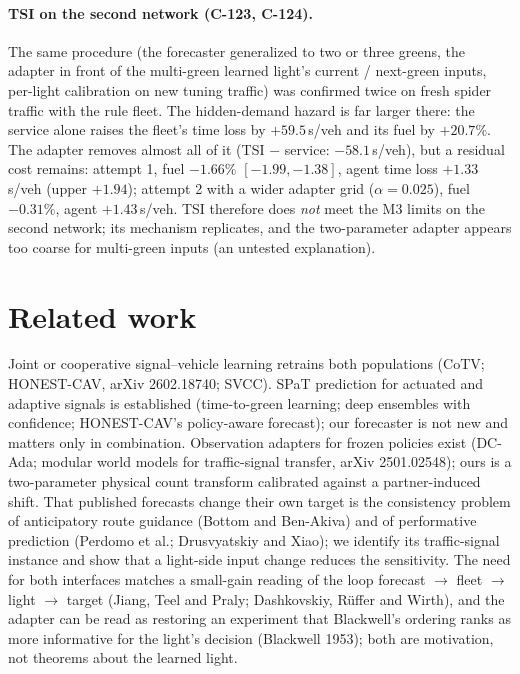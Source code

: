 \documentclass[11pt]{article}
\begin{document}
\paragraph{TSI on the second network (C-123, C-124).} The same procedure (the forecaster generalized to two or three greens, the adapter
in front of the multi-green learned light's current / next-green inputs, per-light calibration on new tuning traffic) was confirmed twice on
fresh spider traffic with the rule fleet. The hidden-demand hazard is far larger there: the service alone raises the fleet's time loss by
$+59.5$\,s/veh and its fuel by $+20.7\%$. The adapter removes almost all of it (TSI $-$ service: $-58.1$\,s/veh), but a residual cost
remains: attempt 1, fuel $-1.66\%$ $[-1.99,-1.38]$, agent time loss $+1.33$\,s/veh (upper $+1.94$); attempt 2 with a wider adapter grid
($\alpha=0.025$), fuel $-0.31\%$, agent $+1.43$\,s/veh. TSI therefore does \emph{not} meet the M3 limits on the second network; its
mechanism replicates, and the two-parameter adapter appears too coarse for multi-green inputs (an untested explanation).

\section{Related work}
Joint or cooperative signal--vehicle learning retrains both populations (CoTV; HONEST-CAV, arXiv 2602.18740; SVCC). SPaT prediction for
actuated and adaptive signals is established (time-to-green learning; deep ensembles with confidence; HONEST-CAV's policy-aware
forecast); our forecaster is not new and matters only in combination. Observation adapters for frozen policies exist (DC-Ada; modular
world models for traffic-signal transfer, arXiv 2501.02548); ours is a two-parameter physical count transform calibrated against a
partner-induced shift. That published forecasts change their own target is the consistency problem of anticipatory route guidance (Bottom
and Ben-Akiva) and of performative prediction (Perdomo et al.; Drusvyatskiy and Xiao); we identify its traffic-signal instance and show that
a light-side input change reduces the sensitivity. The need for both interfaces matches a small-gain reading of the loop forecast $\to$ fleet
$\to$ light $\to$ target (Jiang, Teel and Praly; Dashkovskiy, R\"uffer and Wirth), and the adapter can be read as restoring an experiment
that Blackwell's ordering ranks as more informative for the light's decision (Blackwell 1953); both are motivation, not theorems about the
learned light.
\end{document}
